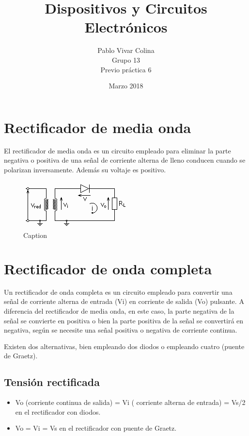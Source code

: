 \documentclass{article}
\title{Dispositivos y Circuitos Electrónicos}
\author{Pablo Vivar Colina \\
Grupo 13\\
Previo práctica 6
}
\date{Marzo 2018}
\begin{document}
\maketitle

\section{Rectificador de media onda}

El rectificador de media onda es un circuito empleado para eliminar la parte negativa o positiva de una señal de corriente alterna de lleno conducen cuando se polarizan inversamente. Además su voltaje es positivo.\citep{circuitoMediaOnda}

\begin{figure}[h!]
    \centering
    \includegraphics{Circuito_rectificador_media_onda.png}
    \caption{Caption}
    \label{fig:rectificadorMedia}
\end{figure}

\section{Rectificador de onda completa}

Un rectificador de onda completa es un circuito empleado para convertir una señal de corriente alterna de entrada (Vi) en corriente de salida (Vo) pulsante. A diferencia del rectificador de media onda, en este caso, la parte negativa de la señal se convierte en positiva o bien la parte positiva de la señal se convertirá en negativa, según se necesite una señal positiva o negativa de corriente continua.

Existen dos alternativas, bien empleando dos diodos o empleando cuatro (puente de Graetz).\citep{circuitoOnda}

\subsection{Tensión rectificada}

\begin{itemize}
    \item  Vo (corriente continua de salida) = Vi ( corriente alterna de entrada) = Vs/2 en el rectificador con diodos.
    \item  Vo = Vi = Vs en el rectificador con puente de Graetz.
\end{itemize}
\end{document}
